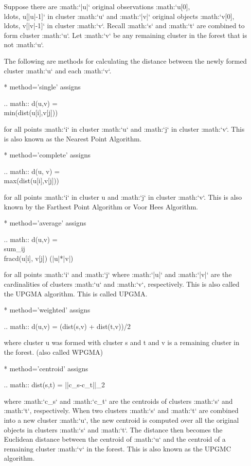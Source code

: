 \begin{DoxyVerb}
Suppose there are :math:`|u|` original observations
:math:`u[0], \\ldots, u[|u|-1]` in cluster :math:`u` and
:math:`|v|` original objects :math:`v[0], \\ldots, v[|v|-1]` in
cluster :math:`v`. Recall :math:`s` and :math:`t` are
combined to form cluster :math:`u`. Let :math:`v` be any
remaining cluster in the forest that is not :math:`u`.

The following are methods for calculating the distance between the
newly formed cluster :math:`u` and each :math:`v`.

  * method='single' assigns

    .. math::
       d(u,v) = \\min(dist(u[i],v[j]))

    for all points :math:`i` in cluster :math:`u` and
    :math:`j` in cluster :math:`v`. This is also known as the
    Nearest Point Algorithm.

  * method='complete' assigns

    .. math::
       d(u, v) = \\max(dist(u[i],v[j]))

    for all points :math:`i` in cluster u and :math:`j` in
    cluster :math:`v`. This is also known by the Farthest Point
    Algorithm or Voor Hees Algorithm.

  * method='average' assigns

    .. math::
       d(u,v) = \\sum_{ij} \\frac{d(u[i], v[j])}
                               {(|u|*|v|)}

    for all points :math:`i` and :math:`j` where :math:`|u|`
    and :math:`|v|` are the cardinalities of clusters :math:`u`
    and :math:`v`, respectively. This is also called the UPGMA
    algorithm. This is called UPGMA.

  * method='weighted' assigns

    .. math::
       d(u,v) = (dist(s,v) + dist(t,v))/2

    where cluster u was formed with cluster s and t and v
    is a remaining cluster in the forest. (also called WPGMA)

  * method='centroid' assigns

    .. math::
       dist(s,t) = ||c_s-c_t||_2

    where :math:`c_s` and :math:`c_t` are the centroids of
    clusters :math:`s` and :math:`t`, respectively. When two
    clusters :math:`s` and :math:`t` are combined into a new
    cluster :math:`u`, the new centroid is computed over all the
    original objects in clusters :math:`s` and :math:`t`. The
    distance then becomes the Euclidean distance between the
    centroid of :math:`u` and the centroid of a remaining cluster
    :math:`v` in the forest. This is also known as the UPGMC
    algorithm.


\end{DoxyVerb}
